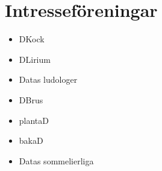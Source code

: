\section{Intresseföreningar}

\begin{itemize}
    \item DKock
    \item DLirium
    \item Datas ludologer
    \item DBrus
    \item plantaD
    \item bakaD
    \item Datas sommelierliga
\end{itemize}

\newpage
